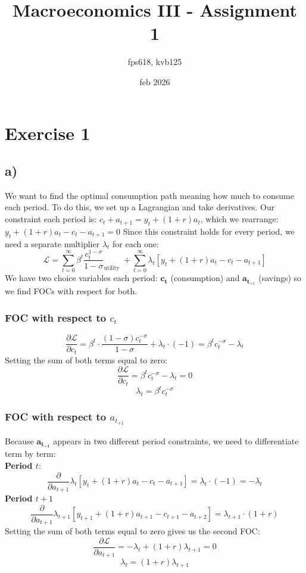 \documentclass[12pt]{article}
\title{Macroeconomics III - Assignment 1}
\author{fps618, kvb125}
\date{feb 2026}
\begin{document}
\maketitle

\section{Exercise 1}
\subsection{a)}
We want to find the optimal consumption path meaning how much to consume each period. To do this, we set up a Lagrangian and take derivatives. Our constraint each period is: $c_t+a_{t+1}=y_t+(1+r) a_t$, which we rearrange: $y_t+(1+r) a_t-c_t-a_{t+1}=0$ Since this constraint holds for every period, we need a separate multiplier $\lambda_t$ for each one: 
$$
\mathcal{L}=\sum_{t=0}^{\infty} \beta^t \frac{c_t^{1-\sigma}}{1-\sigma}_{\text {utility }}+\sum_{t=0}^{\infty} \lambda_t\left[y_t+(1+r) a_t-c_t-a_{t+1}\right]
$$
We have two choice variables each period: $\mathbf{c}_{\mathbf{t}}$ (consumption) and $\mathbf{a}_{\mathbf{t}_{+1}}$ (savings) so we find FOCs with respect for both. 
\subsubsection{FOC with respect to $c_t$}
$$
\frac{\partial \mathcal{L}}{\partial c_t}=\beta^t \cdot \frac{(1-\sigma) c_t^{-\sigma}}{1-\sigma}+\lambda_t \cdot(-1)=\beta^t c_t^{-\sigma}-\lambda_t
$$
Setting the sum of both terms equal to zero:
$$
\frac{\partial \mathcal{L}}{\partial c_t}=\beta^t c_t^{-\sigma}-\lambda_t=0
$$
$$
\boxed{\lambda_t=\beta^t c_t^{-\sigma}}
$$

\subsubsection{FOC with respect to $a_{t_{+1}}$}
Because $\mathbf{a}_{\mathbf{t}_{\mathbf{+ 1}}}$ appears in two different period constraints, we need to differentiate term by term:
\\
\textbf{Period $t$}:
$$
\frac{\partial}{\partial a_{t+1}} \lambda_t\left[y_t+(1+r) a_t-c_t-a_{t+1}\right]=\lambda_t \cdot(-1)=-\lambda_t
$$
\textbf{Period $t+1$}
$$
\frac{\partial}{\partial a_{t+1}} \lambda_{t+1}\left[y_{t+1}+(1+r) a_{t+1}-c_{t+1}-a_{t+2}\right]=\lambda_{t+1} \cdot(1+r)
$$
Setting the sum of both terms equal to zero gives us the second FOC:
$$
\frac{\partial \mathcal{L}}{\partial a_{t+1}}=-\lambda_t+(1+r) \lambda_{t+1}=0
$$
$$\boxed{\lambda_t=(1+r) \lambda_{t+1}}$$
\end{document}
